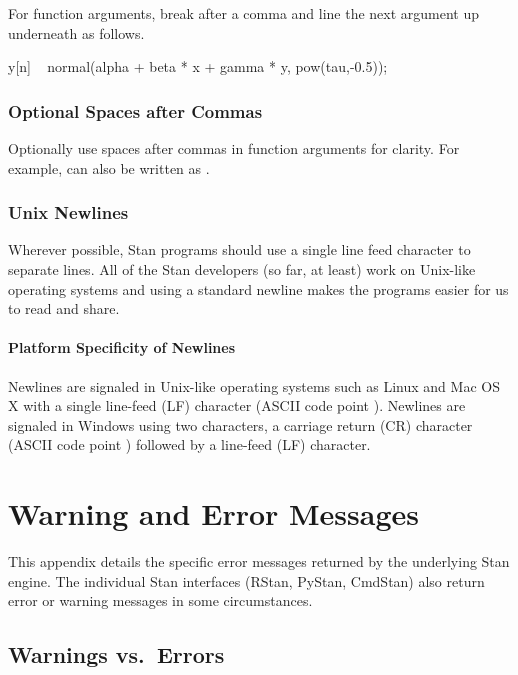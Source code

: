 For function arguments, break after a comma and line the next
argument up underneath as follows.
%
\begin{stancode}
y[n] ~ normal(alpha + beta * x + gamma * y,
              pow(tau,-0.5));
\end{stancode}
%

\subsection{Optional Spaces after Commas}

Optionally use spaces after commas in function arguments for clarity.
For example,  can also be
written as .



\subsection{Unix Newlines}

Wherever possible, Stan programs should use a single line feed 
character to separate lines.  All of the Stan developers (so far, at 
least) work on Unix-like operating systems and using a standard 
newline makes the programs easier for us to read and share.  

\subsubsection{Platform Specificity of Newlines}

Newlines are signaled in Unix-like operating systems such as Linux and
Mac OS X with a single line-feed (LF) character (ASCII code point
).  Newlines are signaled in Windows using two characters,
a carriage return (CR) character (ASCII code point )
followed by a line-feed (LF) character.


\chapter{Warning and Error Messages}\label{error-messages.appendix}

\noindent
This appendix details the specific error messages returned by the
underlying Stan engine.  The individual Stan interfaces (RStan,
PyStan, CmdStan) also return error or warning messages in some
circumstances.

\section{Warnings vs.\ Errors}

